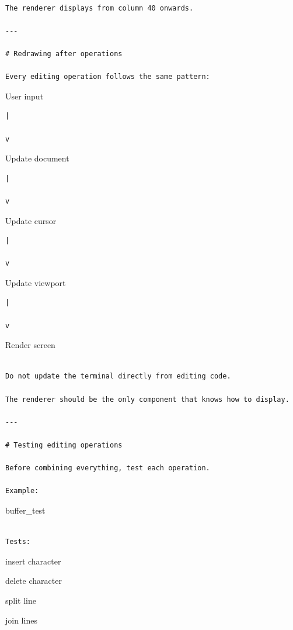 \documentclass[
  oneside,
  openany]{book}
\begin{document}
\begin{verbatim}

The renderer displays from column 40 onwards.

---

# Redrawing after operations

Every editing operation follows the same pattern:
\end{verbatim}

User input

\begin{verbatim}
|

v
\end{verbatim}

Update document

\begin{verbatim}
|

v
\end{verbatim}

Update cursor

\begin{verbatim}
|

v
\end{verbatim}

Update viewport

\begin{verbatim}
|

v
\end{verbatim}

Render screen

\begin{verbatim}

Do not update the terminal directly from editing code.

The renderer should be the only component that knows how to display.

---

# Testing editing operations

Before combining everything, test each operation.

Example:
\end{verbatim}

buffer\_test

\begin{verbatim}

Tests:
\end{verbatim}

insert character

delete character

split line

join lines
\end{document}
